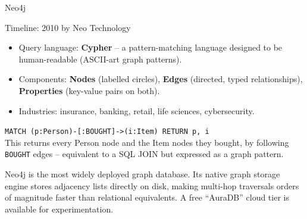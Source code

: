 \begin{frame}{Neo4j}
  \begin{block}{Timeline: 2010 by Neo Technology}
    \begin{itemize}
      \item Query language: \textbf{Cypher} -- a pattern-matching language
            designed to be human-readable (ASCII-art graph patterns).
      \item Components: \textbf{Nodes} (labelled circles), \textbf{Edges}
            (directed, typed relationships), \textbf{Properties}
            (key-value pairs on both).
      \item Industries: insurance, banking, retail, life sciences, cybersecurity.
    \end{itemize}
  \end{block}

  \begin{examples}{}
    \texttt{MATCH (p:Person)-[:BOUGHT]->(i:Item) RETURN p, i}\\[4pt]
    This returns every Person node and the Item nodes they bought, by
    following \texttt{BOUGHT} edges -- equivalent to a SQL JOIN but
    expressed as a graph pattern.
  \end{examples}

  Neo4j is the most widely deployed graph database.  Its native graph storage
  engine stores adjacency lists directly on disk, making multi-hop traversals
  orders of magnitude faster than relational equivalents.  A free ``AuraDB''
  cloud tier is available for experimentation.
\end{frame}

